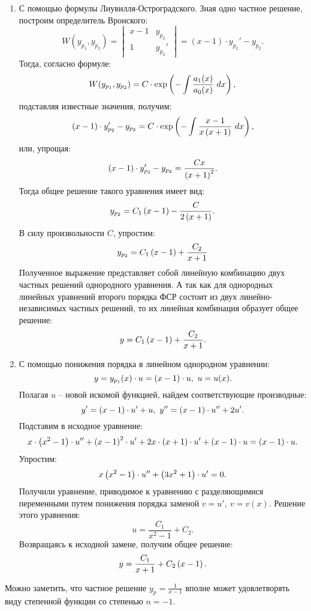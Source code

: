 		\begin{enumerate}
			\item С помощью формулы Лиувилля-Остроградского. Зная одно частное решение, построим определитель Вронского:
				\[ W(y_{p_1}, y_{p_2}) = \begin{vmatrix}
					x - 1 & y_{p_2} \\
					1 & y_{p_2}'
				\end{vmatrix} = (x - 1) \cdot y_{p_2}' - y_{p_2}. \]
				Тогда, согласно формуле:
				\[ W(y_{p_1}, y_{p_2}) = C \cdot \exp\left( -\int \frac{a_1(x)}{a_0(x)} ~ dx \right), \]
				подставляя известные значения, получим:
				\[ (x - 1) \cdot y_{p_2}' - y_{p_2} = C \cdot \exp\left( - \int \frac{x - 1}{x \left( x + 1 \right)} ~ dx \right), \]
				или, упрощая:
				\[ (x - 1) \cdot y_{p_2}' - y_{p_2} = \frac{Cx}{\left( x + 1 \right)^2}. \]
				Тогда общее решение такого уравнения имеет вид:
				\[ y_{p_2} = C_1 \left( x - 1 \right) - \frac{C}{2 \left( x + 1 \right)}. \]
				В силу произвольности $C$, упростим:
				\[ y_{p_2} = C_1 \left( x - 1 \right) + \frac{C_2}{x + 1} \]
				Полученное выражение представляет собой линейную комбинацию двух частных решений однородного уравнения. А так как для однородных линейных уравнений второго порядка ФСР состоит из двух линейно-независимых частных решений, то их линейная комбинация образует общее решение:
				\[ y = C_1 \left( x - 1 \right) + \frac{C_2}{x + 1}. \]

			\item С помощью понижения порядка в линейном однородном уравнении:
				\[ y = y_{p_1}(x) \cdot u = \left( x - 1 \right) \cdot u, ~ u = u(x). \]
				Полагая $u$ -- новой искомой функцией, найдем соответствующие производные:
				\[ y' = \left( x - 1 \right) \cdot u' + u, ~ y'' = \left( x - 1 \right) \cdot u'' + 2u'. \]
				Подставим в исходное уравнение:
				\[ x \cdot \left( x^2 - 1 \right) \cdot u'' + \left( x - 1 \right)^2 \cdot u' + 2 x \cdot \left( x + 1 \right) \cdot u' + \left( x - 1 \right) \cdot u = \left( x - 1 \right) \cdot u. \]
				Упростим:
				\[ x \left( x^2 - 1 \right) \cdot u'' + \left( 3x^2 + 1 \right) \cdot u' = 0. \]
				Получили уравнение, приводимое к уравнению с разделяющимися переменными путем понижения порядка заменой $v = u', ~ v = v(x)$. Решение этого уравнения:
				\[ u = \frac{C_1}{x^2 - 1} + C_2. \]
				Возвращаясь к исходной замене, получим общее решение:
				\[ y = \frac{C_1}{x + 1} + C_2 \left( x - 1 \right). \] 

		\end{enumerate}
		Можно заметить, что частное решение $y_p = \frac{1}{x - 1}$ вполне может удовлетворять виду степенной функции со степенью $n = -1$.

